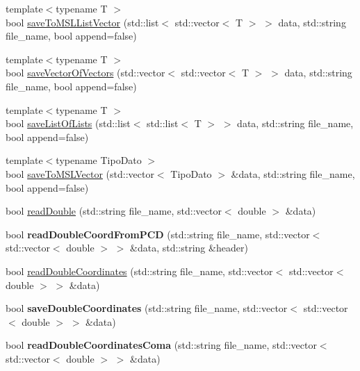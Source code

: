\begin{DoxyCompactItemize}
\item 
{\footnotesize template$<$typename T $>$ }\\bool \hyperlink{classvpFileReader_a4b4c36bae6e71cb92a7276dfeb96eabc}{save\+To\+M\+S\+L\+List\+Vector} (std\+::list$<$ std\+::vector$<$ T $>$ $>$ data, std\+::string file\+\_\+name, bool append=false)
\item 
{\footnotesize template$<$typename T $>$ }\\bool \hyperlink{classvpFileReader_a805ae83c003da403b40a81a9a7601a82}{save\+Vector\+Of\+Vectors} (std\+::vector$<$ std\+::vector$<$ T $>$ $>$ data, std\+::string file\+\_\+name, bool append=false)
\item 
{\footnotesize template$<$typename T $>$ }\\bool \hyperlink{classvpFileReader_ab02ea430b0fa4bddb69a9e394373f5e8}{save\+List\+Of\+Lists} (std\+::list$<$ std\+::list$<$ T $>$ $>$ data, std\+::string file\+\_\+name, bool append=false)
\item 
{\footnotesize template$<$typename Tipo\+Dato $>$ }\\bool \hyperlink{classvpFileReader_a79619141b6993f7a85fa58acbc72df25}{save\+To\+M\+S\+L\+Vector} (std\+::vector$<$ Tipo\+Dato $>$ \&data, std\+::string file\+\_\+name, bool append=false)
\item 
bool \hyperlink{classvpFileReader_a98aa1278b9e5796d0b7635b34114c46c}{read\+Double} (std\+::string file\+\_\+name, std\+::vector$<$ double $>$ \&data)
\item 
bool {\bfseries read\+Double\+Coord\+From\+P\+CD} (std\+::string file\+\_\+name, std\+::vector$<$ std\+::vector$<$ double $>$ $>$ \&data, std\+::string \&header)\hypertarget{classvpFileReader_a0d77b27e9e96d78453a413adf6c2d88e}{}\label{classvpFileReader_a0d77b27e9e96d78453a413adf6c2d88e}

\item 
bool \hyperlink{classvpFileReader_afc2865630555414a8982e1a9d6baae6e}{read\+Double\+Coordinates} (std\+::string file\+\_\+name, std\+::vector$<$ std\+::vector$<$ double $>$ $>$ \&data)
\item 
bool {\bfseries save\+Double\+Coordinates} (std\+::string file\+\_\+name, std\+::vector$<$ std\+::vector$<$ double $>$ $>$ \&data)\hypertarget{classvpFileReader_a8dd4d28deeb912e483457198ed46bf7f}{}\label{classvpFileReader_a8dd4d28deeb912e483457198ed46bf7f}

\item 
bool {\bfseries read\+Double\+Coordinates\+Coma} (std\+::string file\+\_\+name, std\+::vector$<$ std\+::vector$<$ double $>$ $>$ \&data)\hypertarget{classvpFileReader_af48c0938ba084751d0bc436ae4a6ee85}{}\label{classvpFileReader_af48c0938ba084751d0bc436ae4a6ee85}


\end{DoxyCompactItemize}
